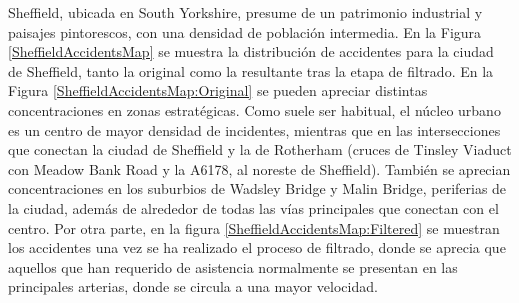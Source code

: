 \documentclass{uathesis-es}
\begin{document}
{Sheffield, ubicada en South Yorkshire, presume de un patrimonio industrial y paisajes pintorescos, con una densidad de población intermedia. En la Figura \ref{SheffieldAccidentsMap} se muestra la distribución de accidentes para la ciudad de Sheffield, tanto la original como la resultante tras la etapa de filtrado. En la Figura \ref{SheffieldAccidentsMap:Original} se pueden apreciar distintas concentraciones en zonas estratégicas. Como suele ser habitual, el núcleo urbano es un centro de mayor densidad de incidentes, mientras que en las intersecciones que conectan la ciudad de Sheffield y la de Rotherham (cruces de Tinsley Viaduct con Meadow Bank Road y la A6178, al noreste de Sheffield). También se aprecian concentraciones en los suburbios de Wadsley Bridge y Malin Bridge, periferias de la ciudad, además de alrededor de todas las vías principales que conectan con el centro. Por otra parte, en la figura \ref{SheffieldAccidentsMap:Filtered} se muestran los accidentes una vez se ha realizado el proceso de filtrado, donde se aprecia que aquellos que han requerido de asistencia normalmente se presentan en las principales arterias, donde se circula a una mayor velocidad.


}
\end{document}
